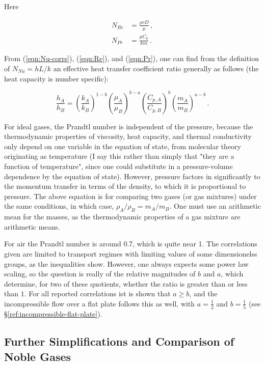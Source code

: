 \documentclass{article}
\begin{document}
Here

\begin{align}
N_{Re} &= \frac{\rho v D}{\mu} \label{eqn:Re}\,,\\
N_{Pr} &= \frac{\mu C_p}{k m} \label{eqn:Pr}\,.
\end{align}

From (\ref{eqn:Nu-corrs}), (\ref{eqn:Re}), and (\ref{eqn:Pr}), one can
find from the definition of $N_{Nu} = hL/k$ an effective heat transfer
coefficient ratio generally as follows (the heat capacity is number specific):


\begin{equation}\label{eqn:main-equation}
\frac{h_A}{h_B} = \left(\frac{k_A}{k_B}\right)^{1-b} 
\left(\frac{\mu_A}{\mu_B}\right)^{b-a} 
\left(\frac{C_{p, A}}{C_{p, B}}\right)^b 
\left(\frac{m_A}{m_B}\right)^{a-b} \,.
\end{equation}

For ideal gases, the Prandtl number is independent of the pressure, because the
thermodynamic properties of viscosity, heat capacity, and thermal conductivity
only depend on one variable in the equation of state, from molecular theory
originating as temperature (I say this rather than simply that "they are a
function of temperature", since one could substitute in a pressure-volume
dependence by the equation of state). However, pressure factors in
significantly to the momentum transfer in terms of the density, to which it is
proportional to pressure. The above equation is for comparing two gases (or gas
mixtures) under the same conditions, in which case, $\rho_A/\rho_B = m_A/m_B$.
One must use an arithmetic mean for the masses, as the thermodynamic properties
of a gas mixture are arithmetic means.

For air the Prandtl number is around 0.7, which is quite near 1. The
correlations given are limited to transport regimes with limiting values of
some dimensionelss groups, as the inequalities show. However, one always
expects some power law scaling, so the question is really of the relative
magnitudes of $b$ and $a$, which determine, for two of these quotients, whether
the ratio is greater than or less than $1$.  For all reported correlations ist
is shown that $a \geq b$, and the incompressible flow over a flat plate follows
this as well, with $a=\frac 12$ and $b=\frac 15$ (see
\S\ref{ref:incompressible-flat-plate}).

\subsection{Further Simplifications and Comparison of Noble Gases}\label{sec:compare-noble}
\end{document}
